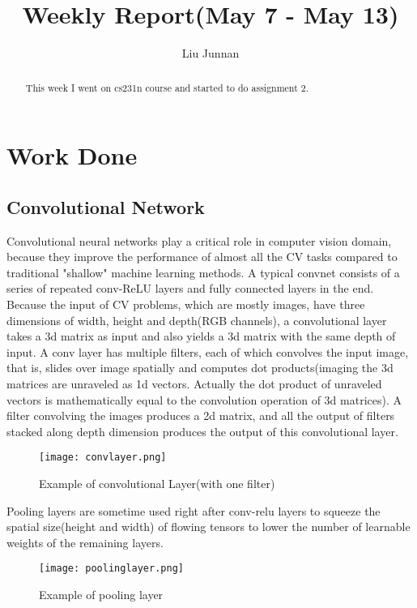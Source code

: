 \documentclass{article} %
\title{Weekly Report(May 7 - May 13)}
\author{
Liu Junnan
}
\begin{document}
\maketitle

\begin{abstract}
This week I went on cs231n course and started to do assignment 2.
\end{abstract}

\section{Work Done}
\subsection{Convolutional Network}
Convolutional neural networks play a critical role in computer vision domain, because they improve the performance of almost all the CV tasks compared to traditional "shallow" machine learning methods. A typical convnet consists of a series of repeated conv-ReLU layers and fully connected layers in the end. Because the input of CV problems, which are mostly images, have three dimensions of width, height and depth(RGB channels), a convolutional layer takes a 3d matrix as input and also yields a 3d matrix with the same depth of input. A conv layer has multiple filters, each of which convolves the input image, that is, slides over image spatially and computes dot products(imaging the 3d matrices are unraveled as 1d vectors. Actually the dot product of unraveled vectors is mathematically equal to the convolution operation of 3d matrices). A filter convolving the images produces a 2d matrix, and all the output of filters stacked along depth dimension produces the output of this convolutional layer.

\begin{figure}[H]
    \centering
    \texttt{[image: convlayer.png]}
    \label{fig:convlayer}
    \caption{Example of convolutional Layer(with one filter)}
\end{figure}

Pooling layers are sometime used right after conv-relu layers to squeeze the spatial size(height and width) of flowing tensors to lower the number of learnable weights of the remaining layers. 
\begin{figure}[H]
    \centering
    \texttt{[image: poolinglayer.png]}
    \label{fig:poolinglayer}
    \caption{Example of pooling layer}
\end{figure}
\end{document}
